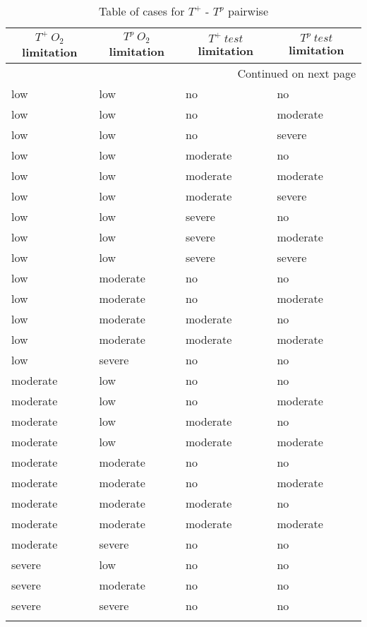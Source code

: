 \begin{longtable}[c]{|l|l|l|l|}

  \hline  \multicolumn{1}{|c|}{\textbf{$T^+\ O_2$ limitation}} & \multicolumn{1}{c|}{\textbf{$T^p\ O_2$ limitation}} & \multicolumn{1}{c|}{\textbf{$T^+\ test$ limitation}} & \multicolumn{1}{c|}{\textbf{$T^p\ test$ limitation}}  \\ \hline
  \endhead

  \hline \multicolumn{4}{|r|}{{Continued on next page}} \\ \hline
  \endfoot

  \endlastfoot
  low & low & no & no \\ \hline
  low & low & no & moderate \\ \hline
  low & low & no & severe \\ \hline
  low & low & moderate & no \\ \hline
  low & low & moderate & moderate \\ \hline
  low & low & moderate & severe \\ \hline
  low & low & severe & no \\ \hline
  low & low & severe & moderate \\ \hline
  low & low & severe & severe \\ \hline
  low & moderate & no & no \\ \hline
  low & moderate & no & moderate \\ \hline
  low & moderate & moderate & no \\ \hline
  low & moderate & moderate & moderate \\ \hline
  low & severe & no & no \\ \hline
  moderate & low & no & no \\ \hline
  moderate & low & no & moderate \\ \hline
  moderate & low & moderate & no \\ \hline
  moderate & low & moderate & moderate \\ \hline
  moderate & moderate & no & no \\ \hline
  moderate & moderate & no & moderate \\ \hline
  moderate & moderate & moderate & no \\ \hline
  moderate & moderate & moderate & moderate \\ \hline
  moderate & severe & no & no \\ \hline
  severe & low & no & no \\ \hline
  severe & moderate & no & no \\ \hline
  severe & severe & no & no \\ \hline
  \caption{Table of cases for $T^+$ - $T^p$ pairwise}
  \label{tab_Tpos-Tpro_cases}
\end{longtable}

